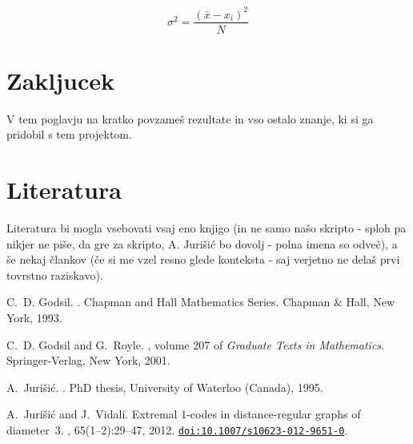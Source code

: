 \documentclass[a4paper,11pt]{article}
\newcommand{\doi}[1]{\href{http://dx.doi.org/#1}{\texttt{doi:#1}}}
\begin{document}
$$\sigma^2 = \frac{(\bar{x} - x_i)^2}{N}$$

\section{Zakljucek}

V tem poglavju na kratko povzameš rezultate in vso ostalo znanje, ki si ga pridobil
s tem projektom.

\section{Literatura}

Literatura bi mogla vsebovati vsaj eno knjigo (in ne samo našo
skripto - sploh pa nikjer ne piše, da gre za skripto, A. Jurišić bo
dovolj - polna imena so odveč), a še nekaj člankov (če si me vzel
resno glede konteksta - saj verjetno ne delaš prvi tovrstno raziskavo).

\begin{footnotesize}
\begin{thebibliography}{10}
C.~D. Godsil.
.
\newblock Chapman and Hall Mathematics Series. Chap\-man \& Hall, New York,
1993.

C.~D. Godsil and G.~Royle.
, volume 207 of {\em Graduate Texts in
Mathematics}.
\newblock Springer-Verlag, New York, 2001.


A.~Jurišić.
.
\newblock PhD thesis, University of Waterloo (Canada), 1995.

A.~Jurišić and J.~Vidali.
\newblock Extremal $1$-codes in distance-regular graphs of dia\-meter~$3$.
, 65(1--2):29--47, 2012.
\newblock \doi{10.1007/s10623-012-9651-0}.

\end{thebibliography}
\end{footnotesize}
\end{document}

